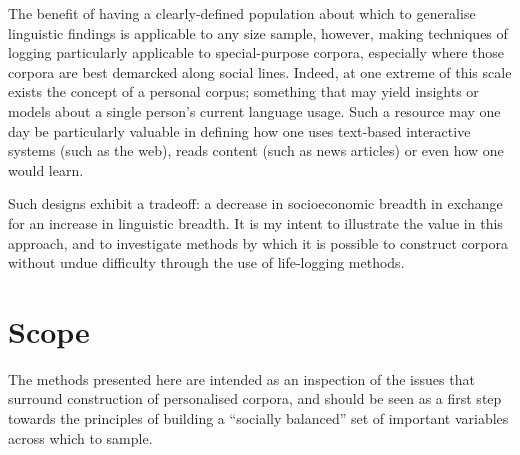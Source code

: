 The benefit of having a clearly-defined population about which to generalise linguistic findings is applicable to any size sample, however, making techniques of logging particularly applicable to special-purpose corpora, especially where those corpora are best demarcked along social lines.  Indeed, at one extreme of this scale exists the concept of a personal corpus; something that may yield insights or models about a single person's current language usage.  Such a resource may one day be particularly valuable in defining how one uses text-based interactive systems (such as the web), reads content (such as news articles) or even how one would learn.

Such designs exhibit a tradeoff: a decrease in socioeconomic breadth in exchange for an increase in linguistic breadth.  It is my intent to illustrate the value in this approach, and to investigate methods by which it is possible to construct corpora without undue difficulty through the use of life-logging methods.













% 
% 




\section{Scope}
The methods presented here are intended as an inspection of the issues that surround construction of personalised corpora, and should be seen as a first step towards the principles of building a ``socially balanced'' set of important variables across which to sample.  






